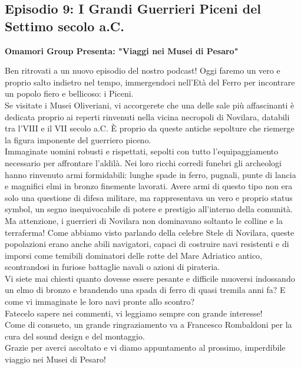\documentclass[hidelinks,12pt,a4paper]{article}
\begin{document}
\begin{flushleft}
		\subsection{Episodio 9: I Grandi Guerrieri Piceni del Settimo secolo a.C.}
		\begin{center}
			\textbf{Omamori Group Presenta: "Viaggi nei Musei di Pesaro"}
		\end{center}
		Ben ritrovati a un nuovo episodio del nostro podcast! Oggi faremo un vero e proprio salto indietro nel tempo, immergendoci nell'Età del Ferro per incontrare un popolo fiero e bellicoso: i Piceni.\\
		Se visitate i Musei Oliveriani, vi accorgerete che una delle sale più affascinanti è dedicata proprio ai reperti rinvenuti nella vicina necropoli di Novilara, databili tra l'VIII e il VII secolo a.C. È proprio da queste antiche sepolture che riemerge la figura imponente del guerriero piceno.\\
		Immaginate uomini robusti e rispettati, sepolti con tutto l'equipaggiamento necessario per affrontare l'aldilà. Nei loro ricchi corredi funebri gli archeologi hanno rinvenuto armi formidabili: lunghe spade in ferro, pugnali, punte di lancia e magnifici elmi in bronzo finemente lavorati. Avere armi di questo tipo non era solo una questione di difesa militare, ma rappresentava un vero e proprio status symbol, un segno inequivocabile di potere e prestigio all'interno della comunità.\\
		Ma attenzione, i guerrieri di Novilara non dominavano soltanto le colline e la terraferma! Come abbiamo visto parlando della celebre Stele di Novilara, queste popolazioni erano anche abili navigatori, capaci di costruire navi resistenti e di imporsi come temibili dominatori delle rotte del Mare Adriatico antico, scontrandosi in furiose battaglie navali o azioni di pirateria.\\
		Vi siete mai chiesti quanto dovesse essere pesante e difficile muoversi indossando un elmo di bronzo e brandendo una spada di ferro di quasi tremila anni fa? E come vi immaginate le loro navi pronte allo scontro?\\
		Fatecelo sapere nei commenti, vi leggiamo sempre con grande interesse!\\
		Come di consueto, un grande ringraziamento va a Francesco Rombaldoni per la cura del sound design e del montaggio.\\
		Grazie per averci ascoltato e vi diamo appuntamento al prossimo, imperdibile viaggio nei Musei di Pesaro!\\
		
		\vspace*{\fill}
		\doclicenseThis
	\end{flushleft}
\end{document}
